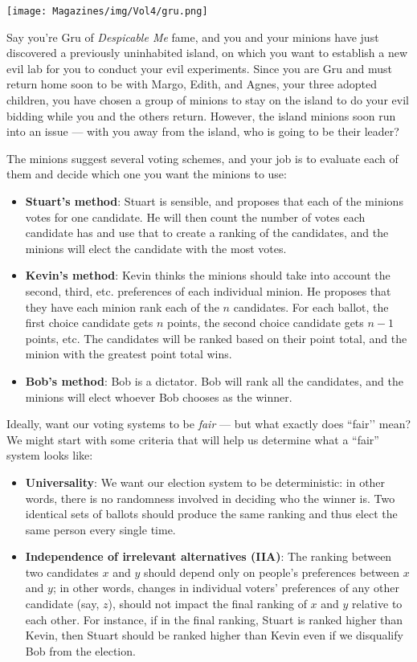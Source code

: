 \documentclass{article}
\begin{document}
\begin{multicols}{3}
\closearticle
{}
\begin{center}
    \texttt{[image: Magazines/img/Vol4/gru.png]}
\end{center}

Say you’re Gru of \textit{Despicable Me} fame, and you and your minions have just discovered a previously uninhabited island, on which you want to establish a new evil lab for you to conduct your evil experiments. Since you are Gru and must return home soon to be with Margo, Edith, and Agnes, your three adopted children, you have chosen a group of minions to stay on the island to do your evil bidding while you and the others return. However, the island minions soon run into an issue --- with you away from the island, who is going to be their leader? 

The minions suggest several voting schemes, and your job is to evaluate each of them and decide which one you want the minions to use:
\begin{itemize}
	\item \textbf{Stuart’s method}: Stuart is sensible, and proposes that each of the minions votes for one candidate. He will then count the number of votes each candidate has and use that to create a ranking of the candidates, and the minions will elect the candidate with the most votes.
	\item \textbf{Kevin’s method}: Kevin thinks the minions should take into account the second, third, etc. preferences of each individual minion. He proposes that they have each minion rank each of the $n$ candidates. For each ballot, the first choice candidate gets $n$ points, the second choice candidate gets $n-1$ points, etc. The candidates will be ranked based on their point total, and the minion with the greatest point total wins.
	\item \textbf{Bob’s method}: Bob is a dictator. Bob will rank all the candidates, and the minions will elect whoever Bob chooses as the winner. 
\end{itemize}

Ideally, want our voting systems to be \textit{fair} --- but what exactly does ``fair’’ mean? We might start with some criteria that will help us determine what a ``fair” system looks like:
\begin{itemize}
	\item \textbf{Universality}: We want our election system to be deterministic: in other words, there is no randomness involved in deciding who the winner is. Two identical sets of ballots should produce the same ranking and thus elect the same person every single time. 
	\item \textbf{Independence of irrelevant alternatives (IIA)}: The ranking between two candidates $x$ and $y$ should depend only on people’s preferences between $x$ and $y$; in other words, changes in individual voters’ preferences of any other candidate (say, $z$), should not impact the final ranking of $x$ and $y$ relative to each other. 
	For instance, if in the final ranking, Stuart is ranked higher than Kevin, then Stuart should be ranked higher than Kevin even if we disqualify Bob from the election. 
	

\end{itemize}
\end{multicols}
\end{document}
